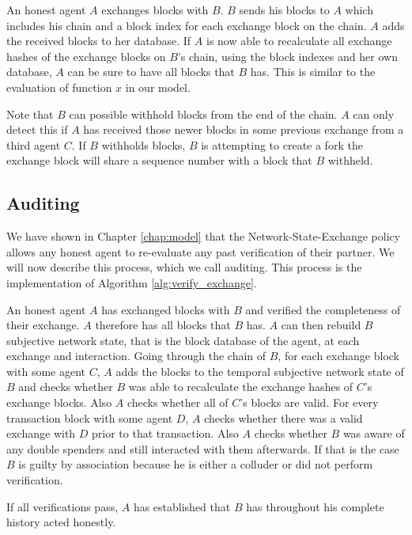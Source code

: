 An honest agent $A$ exchanges blocks with $B$. $B$ sends his blocks to $A$ which includes his chain
and a block index for each exchange block on the chain. 
$A$ adds the received blocks to her database. If $A$ is now able to recalculate all exchange hashes
of the exchange blocks on $B$'s chain, using the block indexes and her own database, $A$ can be 
sure to have all blocks that $B$ has. This is similar to the evaluation of function $x$ in our model.

Note that $B$ can possible withhold blocks from the end of the chain. $A$ can only detect this if 
$A$ has received those newer blocks in some previous exchange from a third agent $C$. If $B$ withholds
blocks, $B$ is attempting to create a fork the exchange block will share a sequence number with a
block that $B$ withheld.

\subsection{Auditing}
We have shown in Chapter \ref{chap:model} that the Network-State-Exchange policy allows any honest
agent to re-evaluate any past verification of their partner. We will now describe this process, which
we call auditing. This process is the implementation of Algorithm \ref{alg:verify_exchange}.

An honest agent $A$ has exchanged blocks with $B$ and verified the completeness of their exchange.
$A$ therefore has all blocks that $B$ has. $A$ can then rebuild $B$ subjective network state, that
is the block database of the agent, at each exchange and interaction. Going through the chain of $B$, 
for each exchange block with some agent $C$, $A$ adds the blocks to the temporal subjective network
state of $B$ and checks whether $B$ was able to recalculate the exchange hashes of $C$'s exchange
blocks. Also $A$ checks whether all of $C$'s blocks are valid. For every transaction block with some
agent $D$, $A$ checks whether there was a valid exchange with $D$ prior to that transaction. Also 
$A$ checks whether $B$ was aware of any double spenders and still interacted with them afterwards. 
If that is the case $B$ is guilty by association because he is either a colluder or did not perform
verification.

If all verifications pass, $A$ has established that $B$ has throughout his complete history acted 
honestly. 


